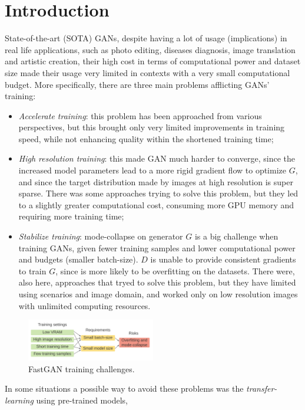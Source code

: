 \documentclass[12pt]{article}
\begin{document}
\section{Introduction}
\large
State-of-the-art (SOTA) GANs, despite having a lot of usage (implications) in real life applications, 
such as photo editing, diseases diagnosis, image translation and artistic creation, their high cost in 
terms of computational power and dataset size made their usage very limited in contexts with a very small
computational budget. More specifically, there are three main problems afflicting GANs' training:
\begin{itemize}
	\setlength\itemsep{0.01em}
	\item \textit{Accelerate training}: this problem has been approached from various perspectives, but this brought
			only very limited improvements in training speed, while not enhancing quality within the shortened training time;
	\item \textit{High resolution training}: this made GAN much harder to converge, since the increased model parameters
			lead to a more rigid gradient flow to optimize $G$, and since the target distribution made by images at high resolution
			is super sparse. There was some approaches trying to solve this problem, but they led to a slightly greater computational
			cost, consuming more GPU memory and requiring more training time;
	\item \textit{Stabilize training}: mode-collapse on generator $G$ is a big challenge when training GANs, given fewer training
			samples and lower computational power and budgets (smaller batch-size). $D$ is unable to provide consistent gradients to 
			train $G$, since is more likely to be overfitting on the datasets. There were, also here, approaches that tryed to solve this 
			problem, but they have limited using scenarios and image domain, and worked only on low resolution images with unlimited computing
			resources.
\end{itemize}
\begin{figure}[H]
	\centering
	\includegraphics[width=0.5\textwidth]{Images/problems.png}
	\caption{FastGAN training challenges.} 
\end{figure}
In some situations a possible way to avoid these problems was the \textit{transfer-learning} using pre-trained models,
\end{document}
